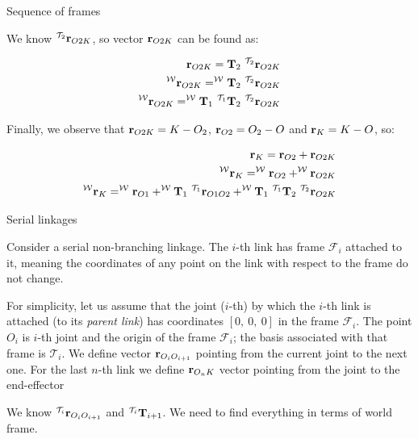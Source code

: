 \documentclass{beamer}
\begin{document}
\begin{frame}{Sequence of frames}
	\begin{flushleft}
		
		We know $^{\mathcal T_2}\mathbf{r}_{O2K}$, so vector $\mathbf{r}_{O2K}$ can be found as:
		
		\begin{align}
			\bo{r}_{O2K} = \mathbf T_2 \  ^{\mathcal T_2}\bo{r}_{O2K}
			 \\
			 ^{\mathcal W} \bo{r}_{O2K} = ^{\mathcal W}\mathbf T_2 \  ^{\mathcal T_2}\bo{r}_{O2K}
			 \\
			 ^{\mathcal W} \bo{r}_{O2K} = ^{\mathcal W}\mathbf T_1 \ ^{\mathcal T_1}\mathbf T_2 \  ^{\mathcal T_2}\bo{r}_{O2K}
		\end{align}
		
		Finally, we observe that $\mathbf{r}_{O2K} = K - O_2$, $\mathbf{r}_{O2} = O_2 - O$ and $\mathbf{r}_{K} = K - O$, so:
		
		\begin{align}
			\mathbf{r}_{K} = \mathbf{r}_{O2} + \mathbf{r}_{O2K} 
			\\
			 ^{\mathcal W} \mathbf{r}_{K} =  ^{\mathcal W} \mathbf{r}_{O2} + ^{\mathcal W}  \mathbf{r}_{O2K} 
			 \\
			 ^{\mathcal W} \mathbf{r}_{K} =  
			 ^{\mathcal W}\mathbf{r}_{O1} + 
			 ^{\mathcal W}\mathbf T_1  \  ^{\mathcal T_1}\mathbf{r}_{O1O2}  +
			 ^{\mathcal W}\mathbf T_1 \ ^{\mathcal T_1}\mathbf T_2 \  ^{\mathcal T_2}\mathbf{r}_{O2K}
		\end{align}		
		
	\end{flushleft}
\end{frame}




\begin{frame}{Serial linkages}
	\begin{flushleft}
		
		Consider a serial non-branching linkage. The $i$-th link has frame $\mathcal F_i$ attached to it, meaning the coordinates of any point on the link with respect to the frame do not change.
		
		\bigskip
		
		For simplicity, let us assume that the joint ($i$-th) by which the $i$-th link is attached (to its \emph{parent link}) has coordinates $[0, \ 0, \ 0]$ in the frame $\mathcal F_i$. The point $O_i$ is $i$-th joint and the origin of the frame $\mathcal F_i$; the basis associated with that frame is $\mathcal T_i$. We define vector $\mathbf{r}_{O_i O_{i+1}}$ pointing from the current joint to the next one. For the last $n$-th link we define $\mathbf{r}_{O_n K}$ vector pointing from the joint to the end-effector
		
		\bigskip
		
		We know $^{\mathcal T_i}\mathbf{r}_{O_i O_{i+1}}$ and $^{\mathcal T_i}\mathbf{T}_{i+1}$. We need to find everything in terms of world frame.
		
	\end{flushleft}
\end{frame}
\end{document}

